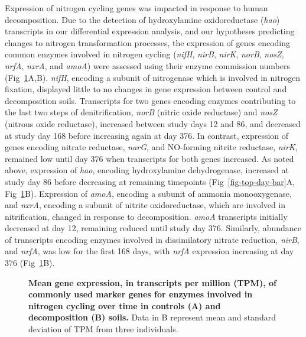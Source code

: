 \documentclass[
  sn-nature,
  lineno, referee]{sn-jnl}
\begin{document}
Expression of nitrogen cycling genes was impacted in response to human
decomposition. Due to the detection of hydroxylamine oxidoreductase
(\emph{hao}) transcripts in our differential expression analysis, and
our hypotheses predicting changes to nitrogen transformation processes,
the expression of genes encoding common enzymes involved in nitrogen
cycling (\emph{nifH}, \emph{nirB}, \emph{nirK}, \emph{norB},
\emph{nosZ}, \emph{nrfA}, \emph{nxrA}, and \emph{amoA}) were assessed
using their enzyme commission numbers (Fig~\ref{fig-n-genes}A,B).
\emph{nifH}, encoding a subunit of nitrogenase which is involved in
nitrogen fixation, displayed little to no changes in gene expression
between control and decomposition soils. Transcripts for two genes
encoding enzymes contributing to the last two steps of denitrification,
\emph{norB} (nitric oxide reductase) and \emph{nosZ} (nitrous oxide
reductase), increased between study days 12 and 86, and decreased at
study day 168 before increasing again at day 376. In contrast,
expression of genes encoding nitrate reductase, \emph{narG}, and
NO-forming nitrite reductase, \emph{nirK}, remained low until day 376
when transcripts for both genes increased. As noted above, expression of
\emph{hao}, encoding hydroxylamine dehydrogenase, increased at study day
86 before decreasing at remaining timepoints
(Fig~\ref{fig-top-day-bar}A, Fig~\ref{fig-n-genes}B). Expression of
\emph{amoA}, encoding a subunit of ammonia monooxygenase, and
\emph{nxrA}, encoding a subunit of nitrite oxidoreductase, which are
involved in nitrification, changed in response to decomposition.
\emph{amoA} transcripts initially decreased at day 12, remaining reduced
until study day 376. Similarly, abundance of transcripts encoding
enzymes involved in dissimilatory nitrate reduction, \emph{nirB}, and
\emph{nrfA}, was low for the first 168 days, with \emph{nrfA} expression
increasing at day 376 (Fig~\ref{fig-n-genes}B).

\begin{figure}[!h]
\caption{{\bf Mean gene expression, in transcripts per million (TPM), of commonly used marker genes for enzymes involved in nitrogen cycling over time in controls (A) and decomposition (B) soils.}
Data in B represent mean and standard deviation of TPM from three individuals.}
\label{fig-n-genes}
\end{figure}
\end{document}
